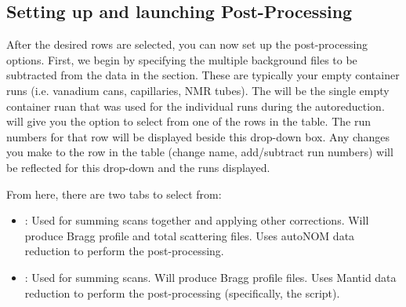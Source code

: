 \subsection{Setting up and launching Post-Processing}

After the desired rows are selected, you can now set up the post-processing options. First, we begin by specifying the multiple background files to be subtracted from the data in the  section. These are typically your empty container runs (i.e. vanadium cans, capillaries, NMR tubes). The  will be the single empty container ruan that was used for the individual runs during the autoreduction.  will give you the option to select from one of the rows in the table. The run numbers for that row will be displayed beside this drop-down box. Any changes you make to the row in the table (change name, add/subtract run numbers) will be reflected for this drop-down and the runs displayed.

\noindent{}

From here, there are two tabs to select from: 

\begin{itemize}

\item {}: Used for summing scans together and applying other corrections. Will produce Bragg profile and total scattering files. Uses autoNOM data reduction to perform the post-processing.

\item {}: Used for summing scans. Will produce Bragg profile files. Uses Mantid data reduction to perform the post-processing (specifically, the \snspowderreduction script).

\end{itemize}

